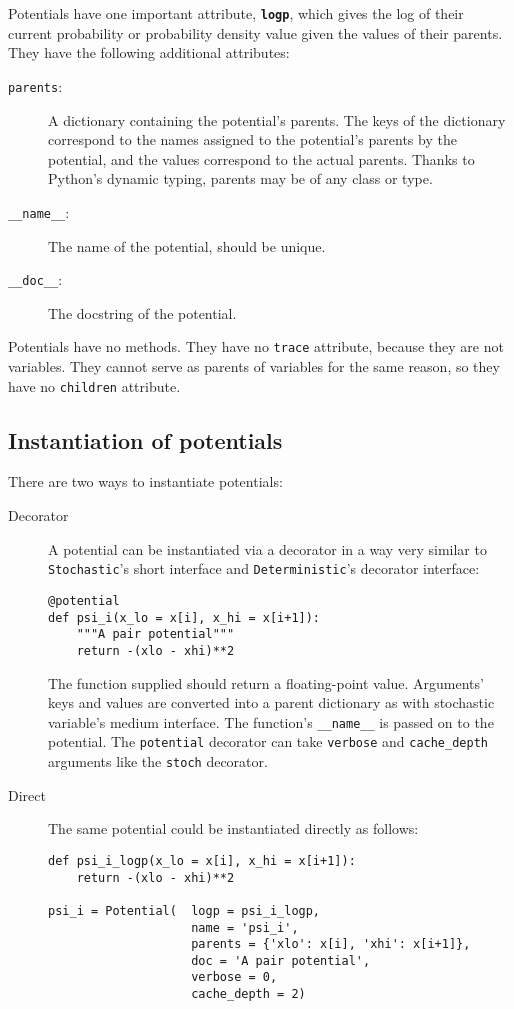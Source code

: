 \bigskip
Potentials have one important attribute, \texttt{\bfseries logp}, which gives the log of their current probability or probability density value given the values of their parents. They have the following additional attributes:
\begin{description}
    \item[\texttt{parents}:] A dictionary containing the potential's parents. The keys of the dictionary correspond to the names assigned to the potential's parents by the potential, and the values correspond to the actual parents. Thanks to Python's dynamic typing, parents may be of any class or type.
    \item[\texttt{__name__}:] The name of the potential, should be unique.
    \item[\texttt{__doc__}:] The docstring of the potential.
\end{description}
Potentials have no methods. They have no \texttt{trace} attribute, because they are not variables. They cannot serve as parents of variables for the same reason, so they have no \texttt{children} attribute.


\subsection{Instantiation of potentials}
There are two ways to instantiate potentials:
\begin{description}
    \item[Decorator] A potential can be instantiated via a decorator in a way very similar to \texttt{Stochastic}'s short interface and \texttt{Deterministic}'s decorator interface:
\begin{verbatim}
@potential
def psi_i(x_lo = x[i], x_hi = x[i+1]):
    """A pair potential"""
    return -(xlo - xhi)**2
\end{verbatim}
The function supplied should return a floating-point value. Arguments' keys and values are converted into a parent dictionary as with stochastic variable's medium interface. The function's \texttt{__name__} is passed on to the potential. The \texttt{potential} decorator can take \texttt{verbose} and \texttt{cache_depth} arguments like the \texttt{stoch} decorator.
    \item[Direct] The same potential could be instantiated directly as follows:
\begin{verbatim}
def psi_i_logp(x_lo = x[i], x_hi = x[i+1]):
    return -(xlo - xhi)**2
        
psi_i = Potential(  logp = psi_i_logp, 
                    name = 'psi_i',
                    parents = {'xlo': x[i], 'xhi': x[i+1]},
                    doc = 'A pair potential',
                    verbose = 0,
                    cache_depth = 2)
\end{verbatim}
\end{description}

